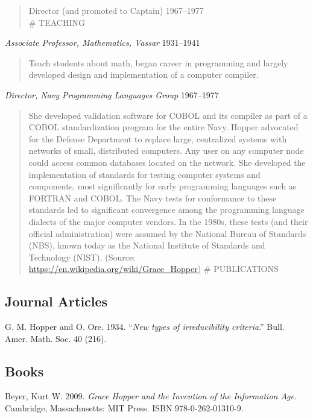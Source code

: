\documentclass[10pt,]{article}
\begin{document}
\begin{quote}
Director (and promoted to Captain) \hfill 1967--1977\\
\# TEACHING
\end{quote}

\emph{Associate Professor, Mathematics, Vassar} \hfill 1931--1941

\begin{quote}
Teach students about math, began career in programming and largely
developed design and implementation of a computer compiler.
\end{quote}

\emph{Director, Navy Programming Languages Group} \hfill 1967--1977

\begin{quote}
She developed validation software for COBOL and its compiler as part of
a COBOL standardization program for the entire Navy. Hopper advocated
for the Defense Department to replace large, centralized systems with
networks of small, distributed computers. Any user on any computer node
could access common databases located on the network. She developed the
implementation of standards for testing computer systems and components,
most significantly for early programming languages such as FORTRAN and
COBOL. The Navy tests for conformance to these standards led to
significant convergence among the programming language dialects of the
major computer vendors. In the 1980s, these tests (and their official
administration) were assumed by the National Bureau of Standards (NBS),
known today as the National Institute of Standards and Technology
(NIST). (Source: \url{https://en.wikipedia.org/wiki/Grace_Hopper}) \#
PUBLICATIONS
\end{quote}

\subsection{\texorpdfstring{\textbf{Journal
Articles}}{Journal Articles}}\label{journal-articles}

G. M. Hopper and O. Ore. 1934. ``\emph{New types of irreducibility
criteria}.'' Bull. Amer. Math. Soc. 40 (216).

\subsection{\texorpdfstring{\textbf{Books}}{Books}}\label{books}

Beyer, Kurt W. 2009. \emph{Grace Hopper and the Invention of the
Information Age}. Cambridge, Massachusetts: MIT Press. ISBN
978-0-262-01310-9.
\end{document}
